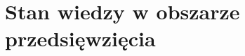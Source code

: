 \documentclass[../main.tex]{subfiles}
\begin{document}
\section{Stan wiedzy w obszarze przedsięwzięcia}
\end{document}
